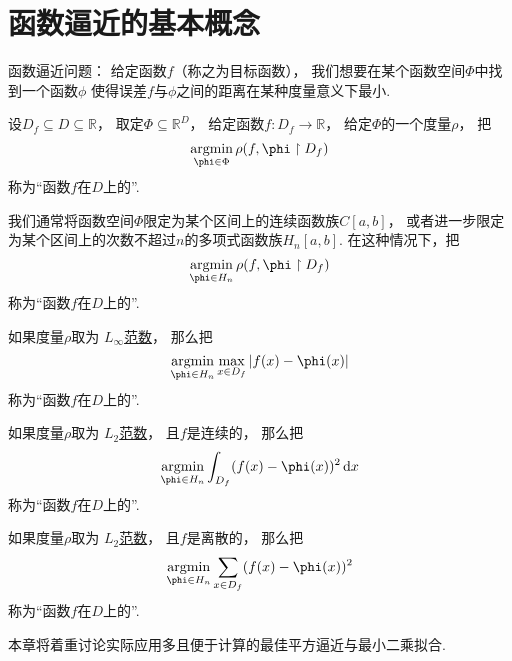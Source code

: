 \section{函数逼近的基本概念}
函数逼近问题：
给定函数\(f\)（称之为目标函数），
我们想要在某个函数空间\(\Phi\)中找到一个函数\(\phi\)
使得误差\(f\)与\(\phi\)之间的距离在某种度量意义下最小.
\begin{definition}
设\(D_f \subseteq D \subseteq \mathbb{R}\)，
取定\(\Phi \subseteq \mathbb{R}^{D}\)，
给定函数\(f\colon D_f \to \mathbb{R}\)，
给定\(\Phi\)的一个度量\(\rho\)，
把\begin{equation*}
	\argmin_{\phi \in \Phi} \rho(f,\phi \SetRestrict D_f)
\end{equation*}
称为“函数\(f\)在\(D\)上的”.
\end{definition}

我们通常将函数空间\(\Phi\)限定为某个区间上的连续函数族\(C[a,b]\)，
或者进一步限定为某个区间上的次数不超过\(n\)的多项式函数族\(H_n[a,b]\).
在这种情况下，把\begin{equation*}
	\argmin_{\phi \in H_n} \rho(f,\phi \SetRestrict D_f)
\end{equation*}
称为“函数\(f\)在\(D\)上的”.

如果度量\(\rho\)取为 \hyperref[equation:范数.连续函数的无穷范数]{\(L_\infty\)范数}，
那么把\begin{equation*}
	\argmin_{\phi \in H_n} \max_{x \in D_f} \abs{f(x) - \phi(x)}
\end{equation*}
称为“函数\(f\)在\(D\)上的”.

如果度量\(\rho\)取为 \hyperref[equation:范数.连续函数的L2范数]{\(L_2\)范数}，
且\(f\)是连续的，
那么把\begin{equation*}
	\argmin_{\phi \in H_n} \int_{D_f} (f(x) - \phi(x))^2 \dd{x}
\end{equation*}
称为“函数\(f\)在\(D\)上的”.

如果度量\(\rho\)取为 \hyperref[equation:范数.连续函数的L2范数]{\(L_2\)范数}，
且\(f\)是离散的，
那么把\begin{equation*}
	\argmin_{\phi \in H_n} \sum_{x \in D_f} (f(x) - \phi(x))^2
\end{equation*}
称为“函数\(f\)在\(D\)上的”.

本章将着重讨论实际应用多且便于计算的最佳平方逼近与最小二乘拟合.
